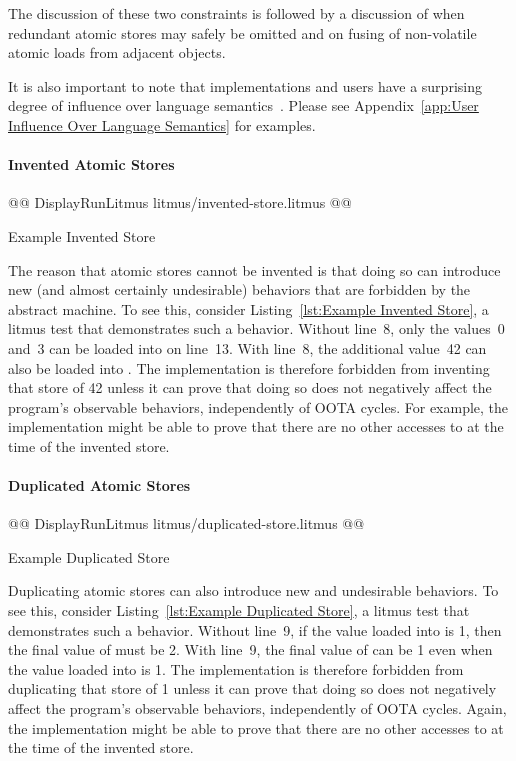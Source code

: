 \documentclass[10]{article}
\begin{document}
The discussion of these two constraints is followed by a discussion of
when redundant atomic stores may safely be omitted and on fusing of
non-volatile atomic loads from adjacent objects.

It is also important to note that implementations and users have a
surprising degree of influence over language
semantics~\cite{KayvanMemarian2016DepthOfC-1,KayvanMemarian2016DepthOfC-2}.
Please see
Appendix~\ref{app:User Influence Over Language Semantics}
for examples.

\paragraph{Invented Atomic Stores}

\begin{listing}[tbp]
@@ DisplayRunLitmus litmus/invented-store.litmus @@
\caption{Example Invented Store}
\label{lst:Example Invented Store}
\end{listing}

The reason that atomic stores cannot be invented is that doing so can
introduce new (and almost certainly undesirable) behaviors that are
forbidden by the abstract machine.
To see this, consider Listing~\ref{lst:Example Invented Store},
a  litmus test that demonstrates such a behavior.
Without line~8, only the values~0 and~3 can be loaded into  on
line~13.
With line~8, the additional value~42 can also be loaded into .
The implementation is therefore forbidden from inventing that store of 42
unless it can prove that doing so does not negatively affect the
program's observable behaviors, independently of OOTA cycles.
For example, the implementation might be able to prove that there
are no other accesses to  at the time of the invented store.

\paragraph{Duplicated Atomic Stores}

\begin{listing}[tbp]
@@ DisplayRunLitmus litmus/duplicated-store.litmus @@
\caption{Example Duplicated Store}
\label{lst:Example Duplicated Store}
\end{listing}

Duplicating atomic stores can also introduce new and undesirable
behaviors.
To see this, consider Listing~\ref{lst:Example Duplicated Store}, a
litmus test that demonstrates such a behavior.
Without line~9, if the value loaded into  is 1, then the final value
of  must be 2.
With line~9, the final value of  can be 1 even when the
value loaded into  is 1.
The implementation is therefore forbidden from duplicating that store of 1
unless it can prove that doing so does not negatively affect the
program's observable behaviors, independently of OOTA cycles.
Again, the implementation might be able to prove that there
are no other accesses to  at the time of the invented store.
\end{document}
